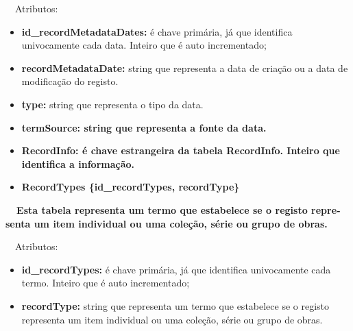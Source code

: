 \documentclass[letterpaper]{article}
\newcommand\textstyleStrongEmphasis[1]{\textbf{#1}}
\newcommand\liststyleLi{%
\renewcommand\labelitemi{{\textbullet}}
\renewcommand\labelitemii{[27A2?]}
\renewcommand\labelitemiii{{\textbullet}}
\renewcommand\labelitemiv{{\textbullet}}
}
\newcommand\liststyleLvi{%
\renewcommand\labelitemi{[27A2?]}
\renewcommand\labelitemii{[27A2?]}
\renewcommand\labelitemiii{[27A2?]}
\renewcommand\labelitemiv{[27A2?]}
}
\begin{document}
{
\ \ Atributos:}

\liststyleLvi
\begin{itemize}
\item {
\textbf{id\_recordMetadataDates}\textbf{:} \'e chave prim\'aria, j\'a
que identifica univocamente cada data. Inteiro que \'e auto
incrementado;}
\item {
\textbf{recordMetadataDate:} string que representa a data de
cria\c{c}\~ao ou a data de modifica\c{c}\~ao do registo.}
\item {
\textbf{type:} string que representa o tipo da data.}
\item {\bfseries
termSource:\textmd{ string que representa a fonte da data.}}
\item {\bfseries
RecordInfo\textmd{:}\textmd{\textit{ }}\textmd{\'e chave estrangeira da
tabela RecordInfo. Inteiro que identifica a informa\c{c}\~ao.}}
\end{itemize}

\bigskip

\liststyleLi
\begin{itemize}
\item {\bfseries
RecordTypes\textmd{ \{}\textmd{id\_recordTypes}\textmd{, recordType\}}}
\end{itemize}
{\bfseries
\foreignlanguage{english}{\textmd{\ \ Esta
}}\textstyleStrongEmphasis{\foreignlanguage{english}{\textmd{tabela}}}\foreignlanguage{english}{\textmd{
representa um termo que estabelece se o registo representa um item
individual ou uma cole\c{c}\~ao, s\'erie ou grupo de
obras}}\foreignlanguage{english}{\textmd{.}}}


\bigskip

{
\ \ Atributos:}

\liststyleLvi
\begin{itemize}
\item {
\textbf{id\_recordTypes}\textbf{:} \'e chave prim\'aria, j\'a que
identifica univocamente cada termo. Inteiro que \'e auto incrementado;}
\item {
\textbf{recordType:} string que representa um termo que estabelece se o
registo representa um item individual ou uma cole\c{c}\~ao, s\'erie ou
grupo de obras.\ \ }
\end{itemize}
\end{document}
